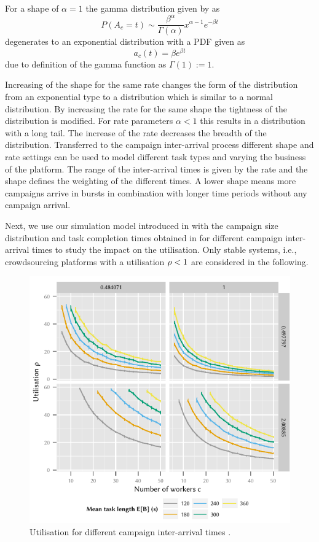 For a shape of \(\alpha = 1\) the gamma distribution given by as
\[
P(A_c=t) \sim \frac{\beta^\alpha}{\Gamma(\alpha)} x^{\alpha-1} e^{-{\beta}t}
\]
degenerates to an exponential distribution with a \gls{PDF} given as
 \[
a_c(t) = \beta e^{\beta t}
 \]
due to definition of the gamma function as \(\Gamma(1) := 1\).

Increasing of the shape for the same rate changes the form of the distribution from an exponential type to a distribution which is similar to a normal distribution.
By increasing the rate for the same shape the tightness of the distribution is modified.
For rate parameters \(\alpha < 1\) this results in a distribution with a long tail.
The increase of the rate decreases the breadth of the distribution.
Transferred to the campaign inter-arrival process \campaignIAT different shape and rate settings can be used to model different task types and varying the business of the platform.
The range of the inter-arrival times is given by the rate and the shape defines the weighting of the different times.
A lower shape means more campaigns arrive in bursts in combination with longer time periods without any campaign arrival.

Next, we use our simulation model introduced in  with the campaign size distribution \campaignSize and task completion times \taskDuration obtained in  for different campaign inter-arrival times to study the impact on the utilisation.
Only stable systems, i.e., crowdsourcing platforms with a utilisation \(\rho < 1\) are considered in the following.

\begin{figure}
	\centering
	\includegraphics{cloud/crowdsourcing/numerical_evaluation/figures/parameter_utilization}
	\caption{Utilisation \workerUtilization for different campaign inter-arrival times \campaignIAT.}
	\label{fig:cloud:crowdsourcing:performance_evaluation:distributions:parameter_utilization}
\end{figure}

